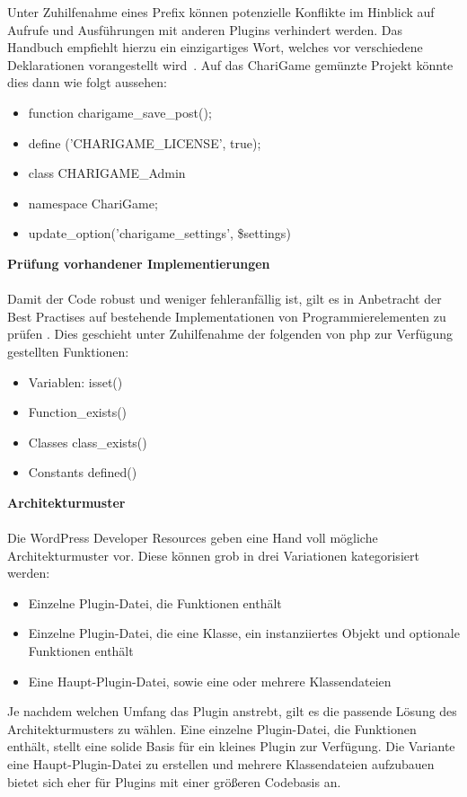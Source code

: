 Unter Zuhilfenahme eines Prefix können potenzielle Konflikte im Hinblick auf Aufrufe und Ausführungen mit anderen Plugins verhindert werden.
Das Handbuch empfiehlt hierzu ein einzigartiges Wort, welches vor verschiedene Deklarationen vorangestellt wird~\cite{wordpress2024ProceduralCodingMethod}.
Auf das ChariGame gemünzte Projekt könnte dies dann wie folgt aussehen:
\begin{itemize}
 \item function charigame\_save\_post();
 \item define ('CHARIGAME\_LICENSE', true);
 \item class CHARIGAME\_Admin{}
 \item namespace ChariGame;
 \item update\_option('charigame\_settings', \$settings)
\end{itemize}
\vspace{1em}
\textbf{Prüfung vorhandener Implementierungen}\\\\
Damit der Code robust und weniger fehleranfällig ist, gilt es in Anbetracht der Best Practises auf bestehende Implementationen von Programmierelementen zu prüfen \cite{wordpress2024CheckExisting}.
Dies geschieht unter Zuhilfenahme der folgenden von \gls{php} zur Verfügung gestellten Funktionen:
\begin{itemize}
 \item Variablen: isset()
 \item Function\_exists() %
 \item Classes class\_exists()
 \item Constants defined()
\end{itemize}
\vspace{1em}
\textbf{Architekturmuster}\\\\
Die WordPress Developer Resources geben eine Hand voll mögliche Architekturmuster vor.
Diese können grob in drei Variationen kategorisiert werden:
\begin{itemize}
 \item Einzelne Plugin-Datei, die Funktionen enthält
 \item Einzelne Plugin-Datei, die eine Klasse, ein instanziiertes Objekt und optionale Funktionen enthält
 \item Eine Haupt-Plugin-Datei, sowie eine oder mehrere Klassendateien
\end{itemize}

Je nachdem welchen Umfang das Plugin anstrebt, gilt es die passende Lösung des Architekturmusters zu wählen.
Eine einzelne Plugin-Datei, die Funktionen enthält, stellt eine solide Basis für ein kleines Plugin zur Verfügung.
Die Variante eine Haupt-Plugin-Datei zu erstellen und mehrere Klassendateien aufzubauen bietet sich eher für Plugins mit einer größeren Codebasis an.

